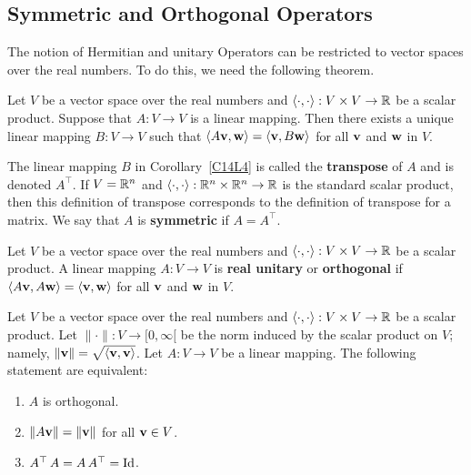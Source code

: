 \subsection{Symmetric and Orthogonal Operators}

The notion of Hermitian and unitary Operators can be restricted to vector
spaces over the real numbers.  To do this, we need the following theorem.

\begin{theorem}
Let $V$ be a vector space over the real numbers and
$\left\langle{\cdot} , {\cdot}\right\rangle :V \times V \rightarrow \mathbb{R}$ be a scalar product.  Suppose
that $A: V \rightarrow V$ is a linear mapping.  Then there exists a
unique linear mapping $B:V \rightarrow V$ such that
$\left\langle{A\mathbf{v}} , {\mathbf{w}}\right\rangle = \left\langle{\mathbf{v}} , {B\mathbf{w}}\right\rangle$ for
all $\mathbf{v}$ and $\mathbf{w}$ in $V$.
\label{C14L4}
\end{theorem}

\begin{defn}
The linear mapping $B$ in Corollary~\ref{C14L4} is called the
{\bfseries transpose} of $A$ and is
denoted $A^\top$.  If $V=\mathbb{R}^n$ and
$\left\langle{\cdot} , {\cdot}\right\rangle : \mathbb{R}^n \times \mathbb{R}^n \to \mathbb{R}$
is the standard scalar product, then this definition of transpose
corresponds to the definition of transpose for a matrix.  We say that
$A$ is {\bfseries symmetric} if
$A = A^\top$. 
\end{defn}

\begin{defn}
Let $V$ be a vector space over the real numbers and
$\left\langle{\cdot} , {\cdot}\right\rangle:V \times V \rightarrow \mathbb{R}$ be a scalar product.
A linear mapping $A: V \rightarrow V$ is
{\bfseries real unitary} or
{\bfseries orthogonal} if
$\left\langle{A\mathbf{v}} , {A\mathbf{w}}\right\rangle = \left\langle{\mathbf{v}} , {\mathbf{w}}\right\rangle$ for all $\mathbf{v}$ and
$\mathbf{w}$ in $V$.
\end{defn}

\begin{theorem}
Let $V$ be a vector space over the real numbers and
$\left\langle{\cdot} , {\cdot}\right\rangle:V \times V \rightarrow \mathbb{R}$ be a scalar product.
Let $\|\cdot\|:V \rightarrow [0,\infty[$ be the norm induced by the scalar
product on $V$; namely, $\|\mathbf{v}\| = \sqrt{\left\langle{\mathbf{v}} , {\mathbf{v}}\right\rangle}$.  Let
$A:V \rightarrow V$ be a linear mapping.  The following statement are
equivalent:
\begin{enumerate}
\item $A$ is orthogonal.
\item $\| A\mathbf{v} \| =  \|\mathbf{v}\|$ for all $\mathbf{v} \in V$.
\item $A^\top\,A = A\,A^\top = \operatorname{Id}$.
\end{enumerate}
\end{theorem}

